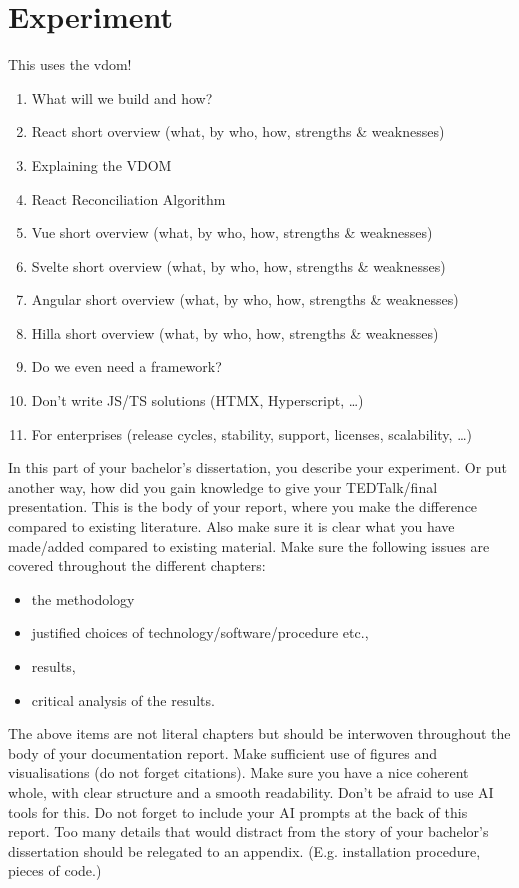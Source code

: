 \chapter{Experiment}





This uses the \acrshort{vdom}!


\begin{enumerate}
    \item What will we build and how?
    \item React short overview (what, by who, how, strengths \& weaknesses)
    \item Explaining the VDOM
    \item React Reconciliation Algorithm
    \item Vue short overview (what, by who, how, strengths \& weaknesses)
    \item Svelte short overview (what, by who, how, strengths \& weaknesses)
    \item Angular short overview (what, by who, how, strengths \& weaknesses)
    \item Hilla short overview (what, by who, how, strengths \& weaknesses)
    \item Do we even need a framework?
    \item Don’t write JS/TS solutions (HTMX, Hyperscript, …) 
    \item For enterprises (release cycles, stability, support, licenses, scalability, …)
\end{enumerate}

In this part of your bachelor's dissertation, you describe your experiment. Or put another way, how did you gain knowledge to give your TEDTalk/final presentation.
This is the body of your report, where you make the difference compared to existing literature. Also make sure it is clear what you have made/added compared to existing material.
Make sure the following issues are covered throughout the different chapters:
\begin{itemize}
    \item the methodology
    \item justified choices of technology/software/procedure etc.,
    \item results,
    \item critical analysis of the results.
\end{itemize}
The above items are not literal chapters but should be interwoven throughout the body of your documentation report.
Make sufficient use of figures and visualisations (do not forget citations). Make sure you have a nice coherent whole, with clear structure and a smooth readability. Don't be afraid to use AI tools for this. Do not forget to include your AI prompts at the back of this report.
Too many details that would distract from the story of your bachelor's dissertation should be relegated to an appendix. (E.g. installation procedure, pieces of code.)
